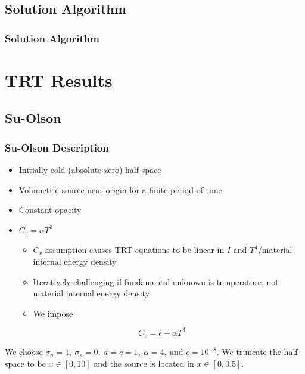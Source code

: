\documentclass{beamer}
\newcommand{\be}{\begin{equation*}}   %
\newcommand{\ee}{\end{equation*}}
\begin{document}
\subsection{Solution Algorithm}
\begin{frame}
\frametitle{Solution Algorithm}

\end{frame}


\section{TRT Results}
\subsection{Su-Olson}
\begin{frame}
\frametitle{Su-Olson Description}
\begin{itemize}
\item Initially cold (absolute zero) half space
\item Volumetric source near origin for a finite period of time
\item Constant opacity
\item $C_v = \alpha T^3$
\begin{itemize}
\item $C_v$ assumption causes TRT equations to be linear in $I$ and $T^4$/material internal energy density
\item Iteratively challenging if fundamental unknown is temperature, not material internal energy density
\item We impose
\end{itemize}
\be
C_v = \epsilon + \alpha T^3
\ee
\end{itemize}
We choose $\sigma_a = 1,~\sigma_s = 0,~a=c=1,~\alpha = 4,~\text{and } \epsilon=10^{-8}$. 
We truncate the half-space to be $x\in[0,10]$ and the source is located in $x\in[0,0.5]$.
\end{frame}

%
%
\end{document}
